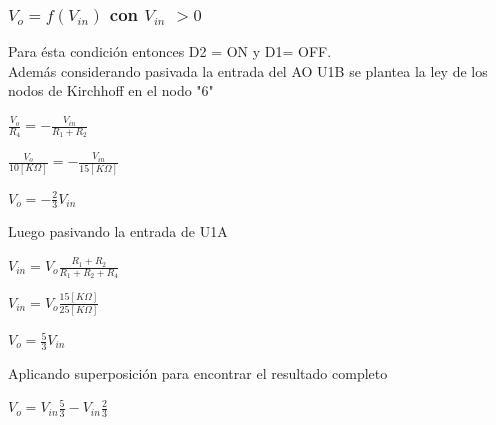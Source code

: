 \subsubsection{$V_o = f(V_{in})$ con $V_{in}$ $> 0$  }
Para ésta condición entonces D2 = ON y D1= OFF. \\
Además considerando pasivada la entrada del AO U1B se plantea la ley de los nodos de Kirchhoff en el nodo "6"
\begin{center}
	$\frac{V_o}{R_4} = - \frac{V_{in}}{R_1 + R_2}$
\end{center}
\begin{center}
	$\frac{V_o}{10[K\Omega]} = - \frac{V_{in}}{15[K\Omega]}$
\end{center}
\begin{center}
	$V_o= - \frac{2}{3} V_{in}$
\end{center}
Luego pasivando la entrada de U1A
\begin{center}
	$V_{in}= V_o \frac{R_1 + R_2}{R_1 + R_2 + R_4}$
\end{center}
\begin{center}
	$V_{in}= V_o \frac{15[K\Omega]}{25[K\Omega]}$
\end{center}
\begin{center}
	$V_o = \frac{5}{3} V_{in}$
\end{center}
Aplicando superposición para encontrar el resultado completo
\begin{center}
	$V_o = V_{in} \frac{5}{3} - V_{in} \frac{2}{3}$
\end{center}
\begin{center}
\end{center}

